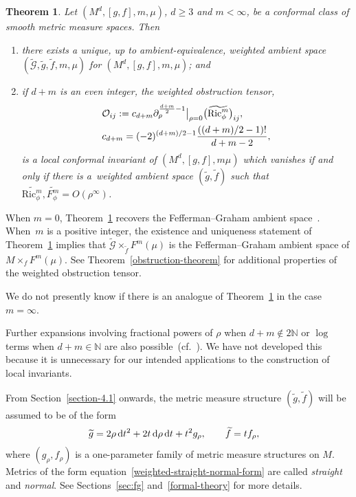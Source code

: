 \documentclass[pdftex]{sigma}
\newcommand{\cf}{\widetilde{f}}
\newcommand{\cmG}{\widetilde{\mathcal{G}}}
\numberwithin{equation}{section}
\newtheorem{Theorem}{Theorem}[section]
\begin{document}
\begin{Theorem}
 \label{ambient-statement}
Let $(M^d, [g, f], m, \mu)$, $d\geq 3$ and $m<\infty$, be a conformal class of smooth metric measure spaces. Then
\begin{enumerate}[label=$(\roman*)$]\itemsep=0pt
\item there exists a unique, up to ambient-equivalence, weighted ambient space $(\widetilde{\mathcal{G}}, \widetilde{g},\widetilde{f},m,\mu)$ for $(M^d,[g,f],m,\mu)$; and

\item if $d+m$ is an even integer, the weighted obstruction tensor,
\begin{align}
&\mathcal{O}_{ij}:=c_{d+m}\partial_\rho^{\frac{d+m}{2}-1}\big|_{\rho=0} \big(\widetilde{{\rm Ric}_\phi^m}\big)_{ij},\nonumber
\\
&c_{d+m}=(-2)^{(d+m)/2-1}\frac{((d+m)/2-1)!}{d+m-2},\label{obstruction-definition}
\end{align}
is a local conformal invariant of $(M^d,[g,f],m\mu)$ which vanishes if and only if there is a~weighted ambient space $(\widetilde{g},\widetilde{f})$ such that $\widetilde{\mathrm{Ric}_\phi^m},\widetilde{F_\phi^m}=O(\rho^{\infty})$.
\end{enumerate}
\end{Theorem}

When $m=0$, Theorem~\ref{ambient-statement} recovers the Fefferman--Graham ambient space~\cite{FeffermanGraham2012}.
When~$m$ is a positive integer, the existence and uniqueness statement of Theorem~\ref{ambient-statement} implies that $\cmG \times_{\cf} F^m(\mu)$ is the Fefferman--Graham ambient space of $M \times_f F^m(\mu)$. See Theorem~\ref{obstruction-theorem} for additional properties of the weighted obstruction tensor.

We do not presently know if there is an analogue of Theorem~\ref{ambient-statement} in the case $m=\infty$.

Further expansions involving fractional powers of $\rho$ when $d+m\notin 2\mathbb{N}$ or $\log$ terms when $d+m\in\mathbb{N}$ are also possible~(cf.~\cite{FeffermanGraham2012}).
We have not developed this because it is unnecessary for our intended applications to the construction of local invariants.

From Section~\ref{section-4.1} onwards, the metric measure structure $(\widetilde{g},\widetilde{f})$ will be assumed to be of the form
\begin{align}
\label{weighted-straight-normal-form}
&\widetilde{g}=2\rho \,\mathrm{d}t^2+2t \,{\rm d}\rho \,\mathrm{d}t+ t^2 g_\rho,\qquad
\widetilde{f}= tf_\rho,
\end{align}
where $(g_\rho,f_\rho)$ is a one-parameter family of metric measure structures on $M$.
Metrics of the form equation~\eqref{weighted-straight-normal-form} are called \emph{straight} and \emph{normal}. See Sections~\ref{sec:fg} and~\ref{formal-theory} for more details.
\end{document}
